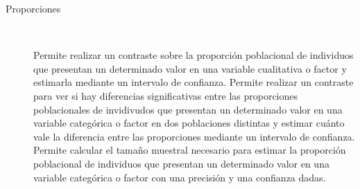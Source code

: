 \documentclass[10pt,twoside,spanish]{article}
\numberwithin{equation}{section}
\begin{document}
\begin{description}
\begin{description}
\item[Proporciones]\hfill\\[-1\baselineskip]
\begin{itemize}
 Permite realizar un contraste sobre la proporción poblacional de individuos que presentan un determinado
valor en una variable cualitativa o factor y estimarla mediante un intervalo de confianza.
 Permite
realizar un contraste para ver si hay diferencias significativas entre las proporciones poblacionales de invidivudos que presentan un determinado valor en una variable categórica o factor en dos poblaciones distintas y estimar
cuánto vale la diferencia entre las proporciones mediante un intervalo de confianza. 
 Permite calcular el tamaño muestral necesario para estimar la proporción 
poblacional de individuos que presentan un determinado valor en una variable categórica o factor con una precisión y una confianza dadas. 
\end{itemize}
\end{description}


\end{description}
\end{document}
